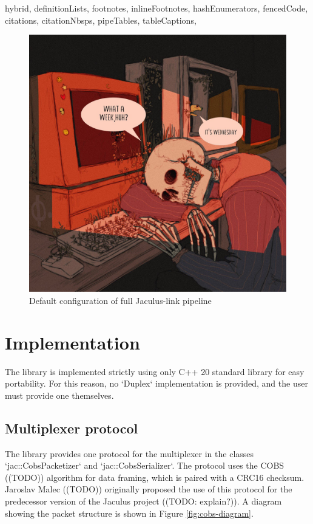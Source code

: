 \documentclass[
  digital,
  oneside,
  nosansbold,
  nocolorbold,
  lof,
  lot
]{fithesis4}
\begin{document}
\begin{markdown*}{%
  hybrid,
  definitionLists,
  footnotes,
  inlineFootnotes,
  hashEnumerators,
  fencedCode,
  citations,
  citationNbsps,
  pipeTables,
  tableCaptions,
}
\begin{figure}[ht]
    \centering
    \includegraphics[width=\textwidth]{link-pipeline}
    \caption{Default configuration of full Jaculus-link pipeline}
    \label{fig:link-pipeline}
\end{figure}


\section{Implementation}

The library is implemented strictly using only C++ 20 standard library for easy portability. For this reason, no `Duplex` implementation is provided, and the user must provide one themselves.

\subsection{Multiplexer protocol}

The library provides one protocol for the multiplexer in the classes `jac::CobsPacketizer` and `jac::CobsSerializer`. The protocol uses the COBS ((TODO)) algorithm for data framing, which is paired with a CRC16 checksum.  Jaroslav Malec ((TODO)) originally proposed the use of this protocol for the predecessor version of the Jaculus project ((TODO: explain?)). A diagram showing the packet structure is shown in Figure \ref{fig:cobs-diagram}.


\end{markdown*}
\end{document}
